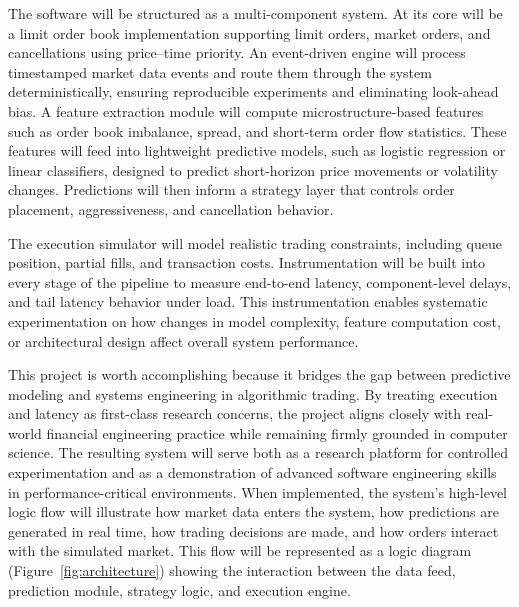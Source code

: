 \documentclass[12pt]{article}
\begin{document}
The software will be structured as a multi-component system. At its core will be a limit order book implementation supporting limit orders, market orders, and cancellations using price–time priority. 
An event-driven engine will process timestamped market data events and route them through the system deterministically, ensuring reproducible experiments and eliminating look-ahead bias. A feature extraction module will compute microstructure-based features such as order book imbalance, spread, and short-term order flow statistics. 
These features will feed into lightweight predictive models, such as logistic regression or linear classifiers, designed to predict short-horizon price movements or volatility changes. 
Predictions will then inform a strategy layer that controls order placement, aggressiveness, and cancellation behavior.


The execution simulator will model realistic trading constraints, including queue position, partial fills, and transaction costs. 
Instrumentation will be built into every stage of the pipeline to measure end-to-end latency, component-level delays, and tail latency behavior under load. 
This instrumentation enables systematic experimentation on how changes in model complexity, feature computation cost, or architectural design affect overall system performance.

This project is worth accomplishing because it bridges the gap between predictive modeling and systems engineering in algorithmic trading. By treating execution and latency as first-class research concerns, the project aligns closely with real-world financial engineering practice while remaining firmly grounded in computer science. 
The resulting system will serve both as a research platform for controlled experimentation and as a demonstration of advanced software engineering skills in performance-critical environments.
When implemented, the system’s high-level logic flow will illustrate how market data enters the system, how predictions are generated in real time, how trading decisions are made, and how orders interact with the simulated market. 
This flow will be represented as a logic diagram (Figure~\ref{fig:architecture}) showing the interaction between the data feed, prediction module, strategy logic, and execution engine.
\end{document}
